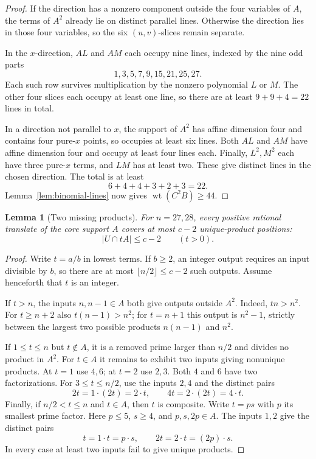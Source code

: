 \documentclass[11pt]{article}
\DeclareMathOperator{\wt}{wt}\DeclareMathOperator{\ord}{ord}
\numberwithin{equation}{section}
\newtheorem{lemma}[theorem]{Lemma}
\theoremstyle{definition}\newtheorem{definition}[theorem]{Definition}
\theoremstyle{remark}\newtheorem{remark}[theorem]{Remark}
\begin{document}
\begin{proof}
If the direction has a nonzero component outside the four variables
of $A$, the terms of $A^2$ already lie on distinct parallel lines.
Otherwise the direction lies in those four variables, so the six
$(u,v)$-slices remain separate.

In the $x$-direction, $AL$ and $AM$ each occupy nine lines, indexed
by the nine odd parts
\[
 1,3,5,7,9,15,21,25,27.
\]
Each such row survives multiplication by the nonzero polynomial
$L$ or $M$. The other four slices each occupy at least one line,
so there are at least $9+9+4=22$ lines in total.

In a direction not parallel to $x$, the support of $A^2$ has affine
dimension four and contains four pure-$x$ points, so occupies at
least six lines. Both $AL$ and $AM$ have affine dimension four and
occupy at least four lines each. Finally, $L^2,M^2$ each have three
pure-$x$ terms, and $LM$ has at least two. These give distinct lines
in the chosen direction. The total is at least
\[
 6+4+4+3+2+3=22.
\]
Lemma~\ref{lem:binomial-lines} now gives $\wt(C^2B)\ge44$.
\end{proof}

\begin{lemma}[Two missing products]\label{lem:two-missing-products}
For $n=27,28$, every positive rational translate of the core support
$A$ covers at most $c-2$ unique-product positions:
\[
 |U\cap tA|\le c-2\qquad(t>0).
\]
\end{lemma}
\begin{proof}
Write $t=a/b$ in lowest terms. If $b\ge2$, an integer output requires
an input divisible by $b$, so there are at most
$\lfloor n/2\rfloor\le c-2$ such outputs. Assume henceforth that
$t$ is an integer.

If $t>n$, the inputs $n,n-1\in A$ both give outputs outside $A^2$.
Indeed, $tn>n^2$. For $t\ge n+2$ also $t(n-1)>n^2$; for $t=n+1$
this output is $n^2-1$, strictly between the largest two possible
products $n(n-1)$ and $n^2$.

If $1\le t\le n$ but $t\notin A$, it is a removed prime larger
than $n/2$ and divides no product in $A^2$. For $t\in A$ it remains
to exhibit two inputs giving nonunique products. At $t=1$ use
$4,6$; at $t=2$ use $2,3$. Both $4$ and $6$ have two factorizations.
For $3\le t\le n/2$, use the inputs $2,4$ and the distinct pairs
\[
 2t=1\cdot(2t)=2\cdot t,
 \qquad 4t=2\cdot(2t)=4\cdot t.
\]
Finally, if $n/2<t\le n$ and $t\in A$, then $t$ is composite.
Write $t=ps$ with $p$ its smallest prime factor. Here $p\le5$,
$s\ge4$, and $p,s,2p\in A$. The inputs $1,2$ give the distinct pairs
\[
 t=1\cdot t=p\cdot s,
 \qquad 2t=2\cdot t=(2p)\cdot s.
\]
In every case at least two inputs fail to give unique products.
\end{proof}
\end{document}
